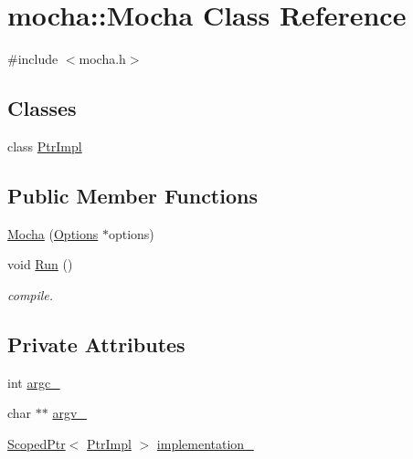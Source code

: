 \hypertarget{classmocha_1_1_mocha}{
\section{mocha::Mocha Class Reference}
\label{classmocha_1_1_mocha}
}


{\ttfamily \#include $<$mocha.h$>$}

\subsection*{Classes}
\begin{DoxyCompactItemize}
\item 
class \hyperlink{classmocha_1_1_mocha_1_1_ptr_impl}{PtrImpl}
\end{DoxyCompactItemize}
\subsection*{Public Member Functions}
\begin{DoxyCompactItemize}
\item 
\hyperlink{classmocha_1_1_mocha_a02e139ab1d61a3a3a51f504bdbf1a1ea}{Mocha} (\hyperlink{classmocha_1_1_options}{Options} $\ast$options)
\begin{DoxyCompactList}\small\item\em \end{DoxyCompactList}\item 
void \hyperlink{classmocha_1_1_mocha_a7e114c48a448556de0d2de3f359974a1}{Run} ()
\begin{DoxyCompactList}\small\item\em compile. \end{DoxyCompactList}\end{DoxyCompactItemize}
\subsection*{Private Attributes}
\begin{DoxyCompactItemize}
\item 
int \hyperlink{classmocha_1_1_mocha_af3e6211e0cea6065db27cd938d9a1361}{argc\_\-}
\item 
char $\ast$$\ast$ \hyperlink{classmocha_1_1_mocha_a50456e24864dfbe295e9461391b5f698}{argv\_\-}
\item 
\hyperlink{classmocha_1_1_scoped_ptr}{ScopedPtr}$<$ \hyperlink{classmocha_1_1_mocha_1_1_ptr_impl}{PtrImpl} $>$ \hyperlink{classmocha_1_1_mocha_a2af59606fa365d8a4cb949ee152cedf1}{implementation\_\-}
\end{DoxyCompactItemize}



